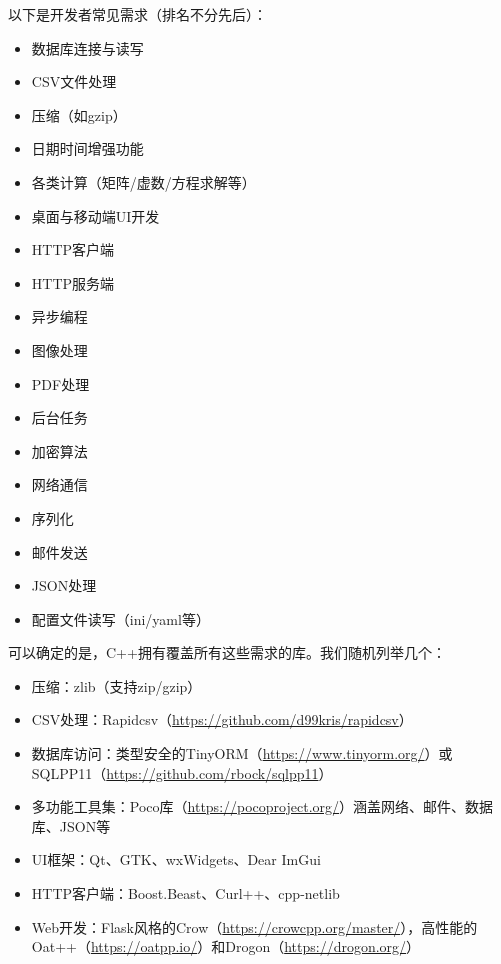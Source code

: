
以下是开发者常见需求（排名不分先后）：

\begin{itemize}
\item 
数据库连接与读写

\item 
CSV文件处理

\item 
压缩（如gzip）

\item 
日期时间增强功能

\item 
各类计算（矩阵/虚数/方程求解等）

\item 
桌面与移动端UI开发

\item 
HTTP客户端

\item 
HTTP服务端

\item 
异步编程

\item 
图像处理

\item 
PDF处理

\item 
后台任务

\item 
加密算法

\item 
网络通信

\item 
序列化

\item 
邮件发送

\item 
JSON处理

\item 
配置文件读写（ini/yaml等）
\end{itemize}

可以确定的是，C++拥有覆盖所有这些需求的库。我们随机列举几个：

\begin{itemize}
\item 
压缩：zlib（支持zip/gzip）

\item 
CSV处理：Rapidcsv（\url{https://github.com/d99kris/rapidcsv}）

\item 
数据库访问：类型安全的TinyORM（\url{https://www.tinyorm.org/}）或SQLPP11（\url{https://github.com/rbock/sqlpp11}）

\item 
多功能工具集：Poco库（\url{https://pocoproject.org/}）涵盖网络、邮件、数据库、JSON等

\item 
UI框架：Qt、GTK、wxWidgets、Dear ImGui

\item 
HTTP客户端：Boost.Beast、Curl++、cpp-netlib

\item 
Web开发：Flask风格的Crow（\url{https://crowcpp.org/master/}），高性能的Oat++（\url{https://oatpp.io/}）和Drogon（\url{https://drogon.org/}）
\end{itemize}

